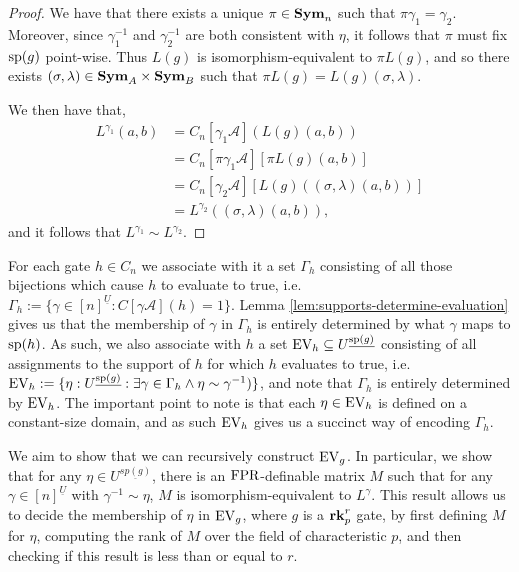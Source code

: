 \documentclass[../paper.tex]{subfiles}
\begin{document}
\begin{proof}
  We have that there exists a unique $\pi \in \text{\textbf{Sym}}_n$ such that $\pi \gamma_1 =
  \gamma_2$. Moreover, since $\gamma^{-1}_1$ and $\gamma^{-1}_2$ are both
  consistent with $\eta$, it follows that $\pi$ must fix $\text{sp}(g)$ point-wise.
  Thus $L(g)$ is isomorphism-equivalent to $\pi L(g)$, and so there exists
  $(\sigma, \lambda) \in \text{\textbf{Sym}}_A \times \text{\textbf{Sym}}_B$ such that $\pi L(g) = L(g)
  (\sigma, \lambda)$.

  We then have that,
  \begin{align*}
    L^{\gamma_1} (a,b) &= C_n[\gamma_1 \mathcal{A}](L(g)(a,b))\\
                       & = C_n[\pi \gamma_1 \mathcal{A}][\pi L(g)(a,b)] \\
                       & = C_n[\gamma_2 \mathcal{A}][L(g)((\sigma, \lambda)(a,b))]\\
                       & = L^{\gamma_2} ((\sigma, \lambda) (a,b)),
  \end{align*}
  and it follows that $L^{\gamma_1} \sim L^{\gamma_2}$.
\end{proof}

For each gate $h \in C_n$ we associate with it a set $\Gamma_h$ consisting of
all those bijections which cause $h$ to evaluate to true, i.e. $\Gamma_h:=
\{\gamma \in [n]^{\underline{U}} : C[\gamma \mathcal{A}](h) = 1 \}$. Lemma
\ref{lem:supports-determine-evaluation} gives us that the membership of $\gamma$
in $\Gamma_h$ is entirely determined by what $\gamma$ maps to $\text{sp}(h)$. As
such, we also associate with $h$ a set $\text{EV}_h \subseteq
U^{\underline{\text{sp}(g)}}$ consisting of all assignments to the support of $h$
for which $h$ evaluates to true, i.e. $\text{EV}_h := \{ \eta:
U^{\underline{\text{sp}(g)}} : \exists \gamma \in \Gamma_h \wedge \eta \sim
\gamma^{-1})\}$, and note that $\Gamma_h$ is entirely determined by $\text{EV}_h$. The
important point to note is that each $\eta \in \text{EV}_h$ is defined on a
constant-size domain, and as such $\text{EV}_h$ gives us a succinct way of encoding
$\Gamma_h$.

We aim to show that we can recursively construct $\text{EV}_g$. In particular, we show
that for any $\eta \in U^{\underline{sp(g)}}$, there is an $\text{\upshape FPR}$-definable
matrix $M$ such that for any $\gamma \in [n]^{\underline{U}}$ with $\gamma^{-1}
\sim \eta$, $M$ is isomorphism-equivalent to $L^{\gamma}$. This result allows us
to decide the membership of $\eta$ in $\text{EV}_g$, where $g$ is a $\text{\textbf{rk}}^r_p$ gate,
by first defining $M$ for $\eta$, computing the rank of $M$ over the field of
characteristic $p$, and then checking if this result is less than or equal to
$r$.
\end{document}
